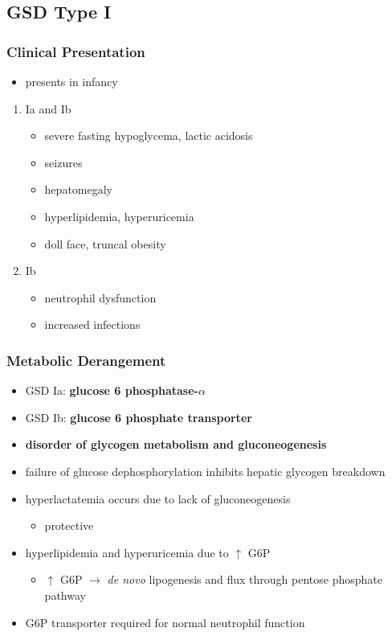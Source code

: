 \documentclass{scrartcl}
\begin{document}
\subsection{GSD Type I}
\label{sec:org9ac64c4}
\subsubsection{Clinical Presentation}
\label{sec:org01b5dc5}
\begin{itemize}
\item presents in infancy
\end{itemize}
\begin{enumerate}
\item Ia and Ib
\label{sec:orgdd7e0fe}
\begin{itemize}
\item severe fasting hypoglycema, lactic acidosis
\item seizures
\item hepatomegaly
\item hyperlipidemia, hyperuricemia
\item doll face, truncal obesity
\end{itemize}
\item Ib
\label{sec:org295fdea}
\begin{itemize}
\item neutrophil dysfunction
\item increased infections
\end{itemize}
\end{enumerate}
\subsubsection{Metabolic Derangement}
\label{sec:orga44ce9d}
\begin{itemize}
\item GSD Ia: \textbf{glucose 6 phosphatase-\(\alpha\)}
\item GSD Ib: \textbf{glucose 6 phosphate transporter}
\item \textbf{disorder of glycogen metabolism and gluconeogenesis}
\item failure of glucose dephosphorylation inhibits hepatic glycogen breakdown
\item hyperlactatemia occurs due to lack of gluconeogenesis
\begin{itemize}
\item protective
\end{itemize}
\item hyperlipidemia and hyperuricemia due to \(\uparrow\) G6P
\begin{itemize}
\item \(\uparrow\) G6P \(\to\) \emph{de novo} lipogenesis and flux through pentose phosphate pathway
\end{itemize}
\item G6P transporter required for normal neutrophil function
\end{itemize}
\end{document}
